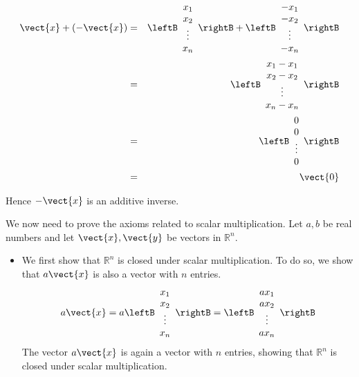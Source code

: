 \begin{solution}
\begin{itemize}
\begin{eqnarray*}
\vect{x} + \left( -\vect{x} \right) &=& 
 \leftB \begin{array}{c}
x_1 \\
x_2 \\
\vdots \\
x_n
\end{array}\rightB + \leftB \begin{array}{c}
-x_1 \\
-x_2 \\
\vdots \\
-x_n
\end{array}\rightB \\
&=& \leftB \begin{array}{c}
x_1-x_1 \\
x_2-x_2 \\
\vdots \\
x_n-x_n
\end{array}\rightB \\
&=& \leftB \begin{array}{c}
0\\
0 \\
\vdots \\
0
\end{array}\rightB \\
&=& \vect{0}
\end{eqnarray*}

Hence $-\vect{x}$ is an additive inverse. 
\end{itemize}

We now need to prove the axioms related to scalar multiplication. Let $a,b$ be real numbers and let $\vect{x}, \vect{y}$ be vectors in $\mathbb{R}^n$. 

\begin{itemize}
\item
We first show that $\mathbb{R}^n$ is closed under scalar multiplication. To do so, we show that $a\vect{x}$ is also a vector with $n$ entries. 
\[
a\vect{x} = a\leftB 
\begin{array}{c}
x_1 \\
x_2 \\
\vdots \\
x_n 
\end{array} \rightB 
=
\leftB 
\begin{array}{c}
ax_1 \\
ax_2 \\
\vdots \\
ax_n 
\end{array} \rightB
\]
The vector $a\vect{x}$ is again a vector with $n$ entries, showing that $\mathbb{R}^n$ is closed under scalar multiplication. 


\end{itemize}
\end{solution}
